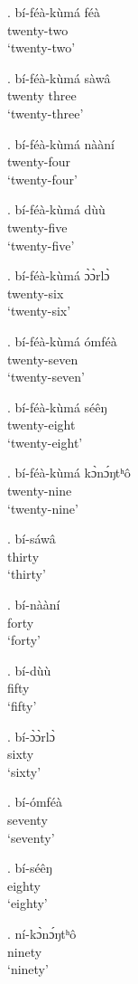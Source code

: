 \documentclass{assets/fieldnotes}
\begin{document}
\exg. bí-féà-kùmá féà\\
twenty-two\\
`twenty-two'

\exg. bí-féà-kùmá sàwâ\\
twenty three\\
`twenty-three'

\exg. bí-féà-kùmá nààní\\
twenty-four\\
`twenty-four'

\exg. bí-féà-kùmá dùù\\
twenty-five\\
`twenty-five'

\exg. bí-féà-kùmá ɔ̀ɔ̀rlɔ̀\\
twenty-six\\
`twenty-six'

\exg. bí-féà-kùmá ómféà\\
twenty-seven\\
`twenty-seven'

\exg. bí-féà-kùmá séêŋ\\
twenty-eight\\
`twenty-eight'

\exg. bí-féà-kùmá kɔ̀nɔ́ŋtʰô\\
twenty-nine\\
`twenty-nine'

\exg. bí-sáwâ\\
thirty\\
`thirty'

\exg. bí-nààní\\
forty\\
`forty'

\exg. bí-dùù\\
fifty\\
`fifty'

\exg. bí-ɔ̀ɔ̀rlɔ̀\\
sixty\\
`sixty'

\exg. bí-ómféà\\
seventy\\
`seventy'

\exg. bí-séêŋ\\
eighty\\
`eighty'

\exg. ní-kɔ̀nɔ́ŋtʰô\\
ninety\\
`ninety'
\end{document}
